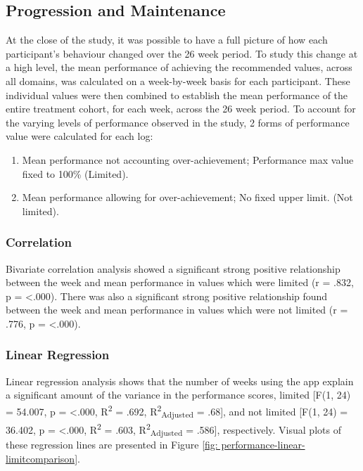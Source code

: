 \subsection{Progression and Maintenance}
At the close of the study, it was possible to have a full picture of how each participant's behaviour changed over the 26 week period.
To study this change at a high level, the mean performance of achieving the recommended values, across all domains, was calculated on a week-by-week basis for each participant. These individual values were then combined to establish the mean performance of the entire treatment cohort, for each week, across the 26 week period. To account for the varying levels of performance observed in the study, 2 forms of performance value were calculated for each log:

\begin{enumerate}[noitemsep,topsep=0pt]
\item Mean performance not accounting over-achievement; Performance max value fixed to 100\% (Limited).
\item Mean performance allowing for over-achievement; No fixed upper limit. (Not limited).
\end{enumerate}

\subsubsection{Correlation}
Bivariate correlation analysis showed a significant strong positive relationship between the week and mean performance in values which were limited (r = .832, p = \textless .000). There was also a significant strong positive relationship found between the week and mean performance in values which were not limited (r = .776, p = \textless .000).

\subsubsection{Linear Regression}
Linear regression analysis shows that the number of weeks using the app explain a significant amount of the variance in the performance scores, limited [F(1, 24) = 54.007, p = \textless.000, R\textsuperscript{2} = .692, R\textsuperscript{2}\textsubscript{Adjusted} = .68], and not limited [F(1, 24) = 36.402, p = \textless.000, R\textsuperscript{2} = .603, R\textsuperscript{2}\textsubscript{Adjusted} = .586], respectively. Visual plots of these regression lines are presented in Figure \ref{fig: performance-linear-limitcomparison}.

